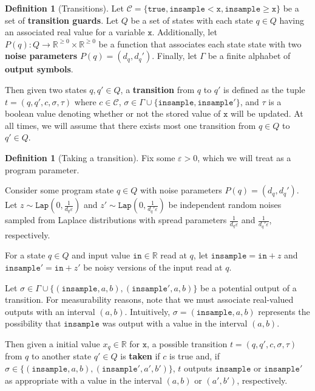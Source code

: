 \documentclass[12pt]{article}
\newcommand{\RR}{\mathbb{R}}
\newcommand{\gguard}[1][x]{\texttt{insample}\geq #1}
\newcommand{\lguard}[1][x]{\texttt{insample} < #1}
\newcommand{\Lap}{\texttt{Lap}}
\theoremstyle{definition}
\newtheorem{defn}[thm]{Definition}
\begin{document}
\begin{defn}[Transitions]
    Let $\mathcal{C}=\{\texttt{true}, \lguard[\texttt{x}], \gguard[\texttt{x}]\}$ be a set of \textbf{transition guards}. Let $Q$ be a set of states with each state $q\in Q$ having an associated real value for a variable $\texttt{x}$. Additionally, let $P(q): Q\to \RR^{\geq 0}\times \RR^{\geq 0}$ be a function that associates each state state with two \textbf{noise parameters} $P(q) = (d_q, d_q')$. Finally, let $\Gamma$ be a finite alphabet of \textbf{output symbols}. 

    Then given two states $q, q'\in Q$, a \textbf{transition} from $q$ to $q'$ is defined as the tuple $t = (q, q', c, \sigma,\tau)$ where $c\in \mathcal{C}$, $\sigma\in \Gamma\cup\{\texttt{insample}, \texttt{insample}'\}$, and $\tau$ is a boolean value denoting whether or not the stored value of $\texttt{x}$ will be updated. At all times, we will assume that there exists most one transition from $q\in Q$ to $q'\in Q$. 
\end{defn}



\begin{defn}[Taking a transition]
    Fix some $\varepsilon>0$, which we will treat as a program parameter.

    Consider some program state $q\in Q$ with noise parameters $P(q) = (d_q, d_q')$. Let $z\sim \Lap(0, \frac{1}{d_q\varepsilon})$ and $z'\sim\Lap(0, \frac{1}{d_q'\varepsilon})$ be independent random noises sampled from Laplace distributions with spread parameters $\frac{1}{d_q\varepsilon}$ and $\frac{1}{d_q'\varepsilon}$, respectively.

    For a state $q\in Q$ and input value $\texttt{in}\in \RR$ read at $q$, let $\texttt{insample} = \texttt{in}+z$ and $\texttt{insample}' = \texttt{in}+z'$ be noisy versions of the input read at $q$. 

    Let $\sigma\in \Gamma\cup\{(\texttt{insample}, a, b), (\texttt{insample}', a, b)\}$ be a potential output of a transition. For measurability reasons, note that we must associate real-valued outputs with an interval $(a, b)$. Intuitively, $\sigma = (\texttt{insample}, a, b)$ represents the possibility that $\texttt{insample}$ was output with a value in the interval $(a, b)$. 

    Then given a initial value $x_q\in \RR$ for $\texttt{x}$, a possible transition $t=(q, q', c, \sigma, \tau)$ from $q$ to another state $q'\in Q$ is \textbf{taken} if $c$ is true and, if $\sigma\in \{(\texttt{insample}, a, b), (\texttt{insample}', a', b')\}$, $t$ outputs $\texttt{insample}$ or $\texttt{insample}'$ as appropriate with a value in the interval $(a, b)$ or $(a', b')$, respectively. 
\end{defn}
\end{document}
